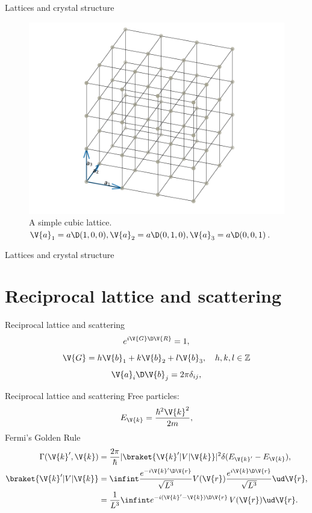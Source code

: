 \documentclass{beamer}
\begin{document}
\begin{frame}{Lattices and crystal structure}
\begin{figure}[H]
	\centering
	\includegraphics[width=.7\linewidth]{figures/cubic_grid.pdf}
	\caption{A simple cubic lattice. $ \V{a}_1 = a\D (1,0,0), \V{a}_2 = a\D(0,1,0), \V{a}_3 = a\D (0,0,1) $.}
	\label{fig:cubic_grid}
\end{figure}
\end{frame}


\begin{frame}{Lattices and crystal structure}
\end{frame}


\section{Reciprocal lattice and scattering}
\begin{frame}{Reciprocal lattice and scattering}
\begin{equation*}
	e^{i \V{G} \D\V{R}} = 1,
\end{equation*}
\begin{equation*}
	\V{G} = h \V{b}_1 + k\V{b}_2 + l\V{b}_3, \quad h,k,l \in \mathbb{Z}
\end{equation*}
\begin{equation*}
	\V{a}_i \D \V{b}_j = 2\pi \delta_{ij},
\end{equation*}
\end{frame}

\begin{frame}{Reciprocal lattice and scattering}
Free particles:
\begin{equation*}
	E_{\V{k}} = \frac{\hbar^2 \V{k}^2}{2m},
\end{equation*}
Fermi's Golden Rule
\begin{align*}
	\Gamma(\V{k}', \V{k}) &= \frac{2\pi}{\hbar}|\braket{\V{k}' | V | \V{k}}|^2 \delta(E_{\V{k}'}-E_{\V{k}}), \\
	\braket{\V{k}' | V | \V{k}} &= \infint \frac{e^{-i \V{k}'\D\V{r}}}{\sqrt{L^3}} V(\V{r}) \frac{e^{i \V{k}\D\V{r}}}{\sqrt{L^3}} \ud \V{r}, \\
	&= \frac{1}{L^3} \infint e^{-i(\V{k}'-\V{k}) \D \V{r}} \, V(\V{r}) \ud \V{r}.
\end{align*}
\end{frame}
\end{document}
